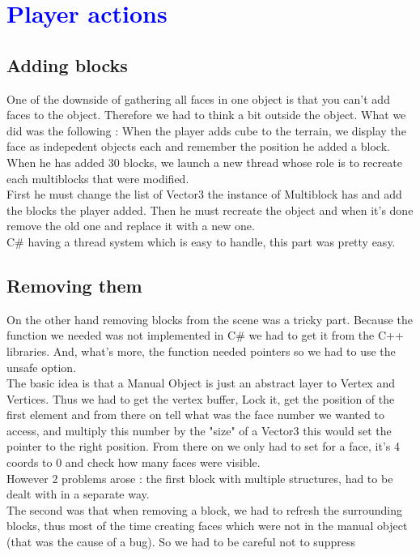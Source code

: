 \documentclass[article]{report} %
\begin{document}
		\chapter{\textcolor{blue}{Player actions}}
			\section{Adding blocks}
				One of the downside of gathering all faces in one object is that you can't add faces to the object. Therefore we had to think a bit outside the object. What we did was the following : When the player adds cube to the terrain, we display the face as indepedent objects each and remember the position he added a block. When he has added 30 blocks, we launch a new thread whose role is to recreate each multiblocks that were modified.\\

		First he must change the list of Vector3 the instance of Multiblock has and add the blocks the player added. Then he must recreate the object and when it's done remove the old one and replace it with a new one.\\

		C\# having a thread system which is easy to handle, this part was pretty easy.
				
			\section{Removing them}
				On the other hand removing blocks from the scene was a tricky part. Because the function we needed was not implemented in C\# we had to get it from the C++ libraries. And, what's more, the function needed pointers so we had to use the unsafe option.\\
The basic idea is that a Manual Object is just an abstract layer to Vertex and Vertices. Thus we had to get the vertex buffer, Lock it, get the position of the first element and from there on tell what was the face number we wanted to access, and multiply this number by the "size" of a Vector3 this would set the pointer to the right position. From there on we only had to set for a face, it's 4 coords to 0 and check how many faces were visible.\\

However 2 problems arose : the first block with multiple structures, had to be dealt with in a separate way. \\
The second was that when removing a block, we had to refresh the surrounding blocks, thus most of the time creating faces which were not in the manual object (that was the cause of a bug). So we had to be careful not to suppress 
\end{document}
